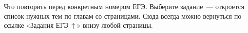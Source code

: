 \clearpage
\renewcommand\pfKolontitul{Задания ЕГЭ $\to$ темы}\renewcommand\pfRazdel{}\renewcommand\pfGlavaKod{}%
\label{ukazatel}\hypertarget{ukazatel}{}%
{\small\color{pfSeryj}Что повторить перед конкретным номером ЕГЭ. Выберите задание~— откроется
список нужных тем по главам со страницами. Сюда всегда можно вернуться по ссылке
«Задания ЕГЭ$\,\uparrow$» внизу любой страницы.}\par\vspace{4mm}

